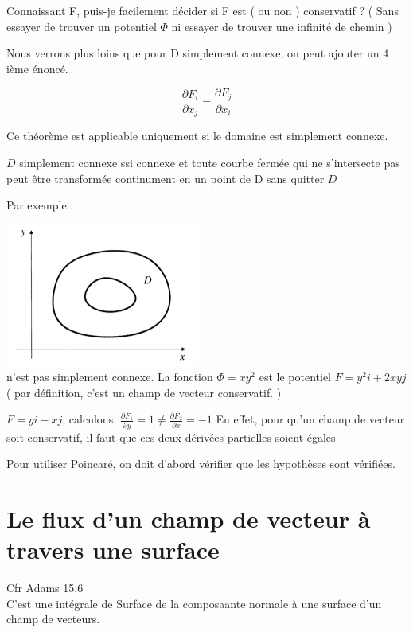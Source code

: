 \begin{mytheo}[Poincaré]
Connaissant F, puis-je facilement décider si F est ( ou non ) conservatif ? ( Sans essayer de trouver un potentiel $\Phi$ ni essayer de trouver une infinité de chemin )

Nous verrons plus loins que pour D simplement connexe, on peut ajouter un 4 ième énoncé.

$$\frac{\partial F_i}{\partial x_j} = \frac{\partial F_j}{\partial x_i}$$

Ce théorème est applicable uniquement si le domaine est simplement connexe.
\end{mytheo}

\begin{mydef}
$D$ simplement connexe ssi connexe et toute courbe fermée qui ne s'intersecte pas peut être  transformée continument en un point de D sans quitter $D$
\end{mydef}

Par exemple :

\includegraphics[scale=0.7]{image2.png}\\
n'est pas simplement connexe.
La fonction $ \Phi =xy^2 $  est le potentiel $F=y^2i+2xyj$ ( par définition, c'est un champ de vecteur conservatif. )

$F= yi-xj$, calculons, $\frac{\partial F_1}{\partial y} = 1 \neq \frac{\partial F_2}{\partial x} = -1$ En effet, pour qu'un champ de vecteur soit conservatif, il faut que ces deux dérivées partielles soient égales

Pour utiliser Poincaré, on doit d'abord vérifier que les hypothèses sont vérifiées.

\section{Le flux d'un champ de vecteur à travers une surface}

Cfr Adams 15.6\\

C'est une intégrale de Surface de la composaante normale à une surface d'un champ de vecteurs.

